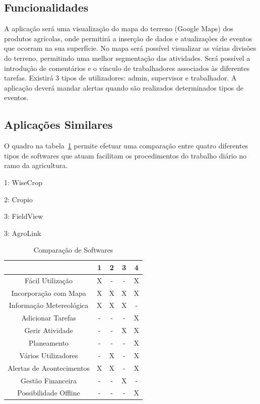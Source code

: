 \documentclass[conference]{IEEEtran}
\begin{document}
	\subsection{Funcionalidades}
	
	A aplicação será uma visualização do mapa do terreno (Google Maps) dos produtos agrícolas, onde permitirá a inserção de dados e atualizações de eventos que ocorram na sua superfície. No mapa será possível visualizar as várias divisões do terreno, permitindo uma melhor segmentação das atividades. Será possível a introdução de comentários e o vínculo de trabalhadores associados às diferentes tarefas. Existirá 3 tipos de utilizadores: admin, supervisor e trabalhador. A aplicação deverá mandar alertas quando são realizados determinados tipos de eventos.
	
	\subsection{Aplicações Similares}
	
	O quadro na tabela~\ref{table:Comparação de Softwares} permite efetuar uma comparação entre quatro diferentes tipos de softwares que atuam facilitam os procedimentos do trabalho diário no ramo da agricultura.
	
	
	1: WiseCrop
	
	2: Cropio
	
	3: FieldView
	
	3: AgroLink
	
	\begin{table}[h]
		\begin{center}
		 \caption{Comparação de Softwares}
		 \label{table:Comparação de Softwares}
		\begin{tabular}{ | c | c | c | c | c |  } 
		\hline
		 & 1 & 2 & 3 & 4 \\ 
		\hline
		Fácil Utilização & X & - & - & X \\ 
		\hline
		Incorporação com Mapa & X & X & X & X \\ 
		\hline
		Informação Metereológica & X & X & X & - \\ 
		\hline
		Adicionar Tarefas  & - & - & - & X \\ 
		\hline
		Gerir Atividade  & - & - & X & X \\ 
		\hline
		Planeamento & - & - & - & X \\ 
		\hline
		Vários Utilizadores & - & X & - & X \\ 
		\hline
		Alertas de Acontecimentos & X & X & - & X \\ 
		\hline
		Gestão Financeira & - & - & X & - \\ 
		\hline
		Possibilidade Offline & - & - & - & X \\ 
		\hline
		\end{tabular}
		\end{center}
	\end{table}
\end{document}
